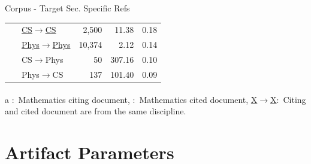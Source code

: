 \documentclass[en,16:9,smallfoot]{sdqbeamer}
\begin{document}
\begin{frame}{Corpus - Target Sec. Specific Refs}
\begin{table}
\begin{scriptsize}
\begin{threeparttable}
\begin{tabular}{llrrr}
       \ & \underline{CS$\rightarrow$CS} & 2,500 & 11.38 & 0.18 \\ %
       \ & \underline{Phys$\rightarrow$Phys} & 10,374 & 2.12 & 0.14 \\ %
       \ & CS$\rightarrow$Phys & 50 & 307.16 & 0.10 \\ %
       \ & Phys$\rightarrow$CS & 137 & 101.40 & 0.09  \\ %
      \bottomrule
    \end{tabular}
     \begin{tablenotes}
        \item[a] {\color{contextgrey}\textsuperscript{\textdagger}:~Mathematics citing document, \textsuperscript{\textdaggerdbl}:~Mathematics cited document, \underline{X$\rightarrow$X}:~Citing and cited document are from the same discipline.}
      \end{tablenotes}
     \end{threeparttable}
    \end{scriptsize}
    \end{table}
   \end{frame}

\section{Artifact Parameters}
\end{document}
